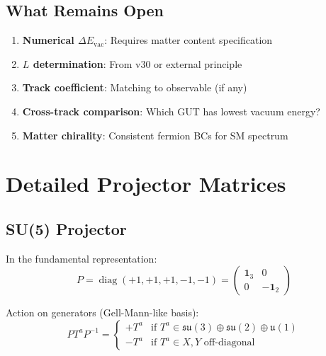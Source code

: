 \documentclass[11pt,a4paper]{article}
\DeclareMathOperator{\diag}{diag}
\begin{document}
\subsection{What Remains Open}

\begin{enumerate}
    \item \textbf{Numerical $\Delta E_{\text{vac}}$}: Requires matter content specification
    \item \textbf{$L$ determination}: From v30 or external principle
    \item \textbf{Track coefficient}: Matching to observable (if any)
    \item \textbf{Cross-track comparison}: Which GUT has lowest vacuum energy?
    \item \textbf{Matter chirality}: Consistent fermion BCs for SM spectrum
\end{enumerate}

\appendix

\section{Detailed Projector Matrices}
\label{app:projectors}

\subsection{SU(5) Projector}

In the fundamental representation:
\begin{equation}
\label{eq:app-su5-P}
P = \diag(+1, +1, +1, -1, -1) = \begin{pmatrix} \mathbf{1}_3 & 0 \\ 0 & -\mathbf{1}_2 \end{pmatrix}
\end{equation}

Action on generators (Gell-Mann-like basis):
\begin{equation}
\label{eq:app-su5-action}
P T^a P^{-1} = \begin{cases}
+T^a & \text{if } T^a \in \mathfrak{su}(3) \oplus \mathfrak{su}(2) \oplus \mathfrak{u}(1) \\
-T^a & \text{if } T^a \in X, Y \text{ off-diagonal}
\end{cases}
\end{equation}
\end{document}
